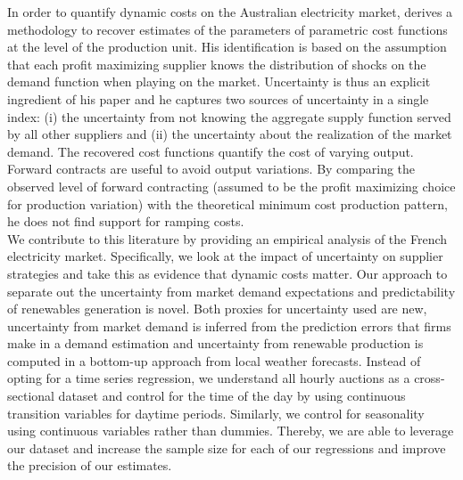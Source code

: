 In order to quantify dynamic costs on the Australian electricity market, \cite{wolak2007quantifying} derives a methodology to recover estimates of the parameters of parametric cost functions at the level of the production unit. His identification is based on the assumption that each profit maximizing supplier knows the distribution of shocks on the demand function when playing on the market. Uncertainty is thus an explicit ingredient of his paper and he captures two sources of uncertainty in a single index: (i) the uncertainty from not knowing the aggregate supply function served by all other suppliers and (ii) the uncertainty about the realization of the market demand.  The recovered cost functions quantify the cost of varying output. Forward contracts are useful to avoid output variations. By comparing the observed  level of forward contracting (assumed to be the profit maximizing choice for production variation) with the theoretical minimum cost production pattern, he %
does not find support for ramping costs.\\

We contribute to this literature by providing an empirical analysis of the French electricity market.
Specifically, we look at the impact of uncertainty on supplier strategies and take this as evidence that dynamic costs matter. 
 Our approach to separate out the uncertainty from market demand expectations and predictability of renewables generation is novel. Both proxies for uncertainty used are new, uncertainty from market demand is inferred from the prediction errors that firms make in a demand estimation and uncertainty from renewable production is computed in a bottom-up approach from local weather forecasts.
Instead of opting for a time series regression, we understand all hourly auctions as a cross-sectional dataset and control for the time of the day by using continuous transition variables for daytime periods. Similarly, we control for seasonality using continuous variables rather than dummies.  Thereby, %
we are able to leverage our dataset and increase the sample size for each of our regressions and improve the precision of our estimates. \\



